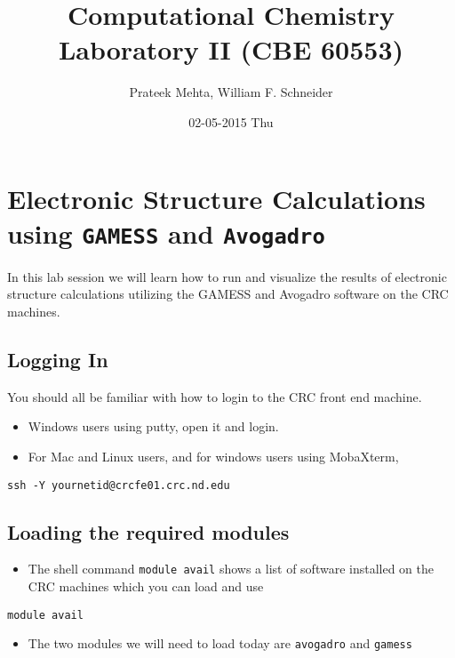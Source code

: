 \documentclass[11pt]{article}
\author{Prateek Mehta, William F. Schneider}
\date{02-05-2015 Thu}
\title{Computational Chemistry Laboratory II (CBE 60553)}
\begin{document}
\maketitle

\section{Electronic Structure Calculations using \texttt{GAMESS} and \texttt{Avogadro}}
\label{sec-1}

In this lab session we will learn how to run and visualize the results of electronic structure calculations utilizing the GAMESS and Avogadro software on the CRC machines.

\subsection{Logging In}
\label{sec-1-1}

You should all be familiar with how to login to the CRC front end machine.

\begin{itemize}
\item Windows users using putty, open it and login.

\item For Mac and Linux users, and for windows users using MobaXterm,
\end{itemize}

\begin{verbatim}
ssh -Y yournetid@crcfe01.crc.nd.edu
\end{verbatim}

\subsection{Loading the required modules}
\label{sec-1-2}

\begin{itemize}
\item The shell command \verb~module avail~ shows a list of software installed on the CRC machines which you can load and use
\end{itemize}

\begin{verbatim}
module avail
\end{verbatim}


\begin{itemize}
\item The two modules we will need to load today are \verb~avogadro~ and \verb~gamess~
\end{itemize}
\end{document}
